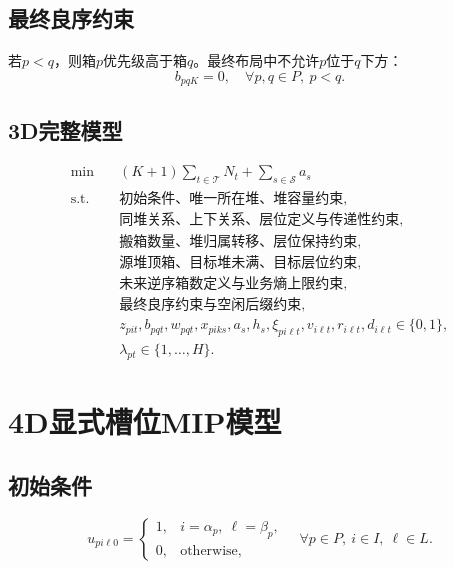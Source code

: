 \documentclass[11pt,a4paper]{ctexart}
\begin{document}
\subsection{最终良序约束}
若$p<q$，则箱$p$优先级高于箱$q$。最终布局中不允许$p$位于$q$下方：
\begin{equation}
b_{pqK}=0,\quad \forall p,q\in P,\ p<q.
\end{equation}

\subsection{3D完整模型}
\begin{equation}
\begin{aligned}
\min\quad
& (K+1)\sum_{t\in\mathcal{T}}N_t+\sum_{s\in\mathcal{S}} a_s\\
\textrm{s.t.}\quad
& \text{初始条件、唯一所在堆、堆容量约束},\\
& \text{同堆关系、上下关系、层位定义与传递性约束},\\
& \text{搬箱数量、堆归属转移、层位保持约束},\\
& \text{源堆顶箱、目标堆未满、目标层位约束},\\
& \text{未来逆序箱数定义与业务熵上限约束},\\
& \text{最终良序约束与空闲后缀约束},\\
& z_{pit},b_{pqt},w_{pqt},x_{piks},a_s,h_s,\xi_{pi\ell t},v_{i\ell t},r_{i\ell t},d_{i\ell t}\in\{0,1\},\\
& \lambda_{pt}\in\{1,\ldots,H\}.
\end{aligned}
\end{equation}

\section{4D显式槽位MIP模型}

\subsection{初始条件}
\begin{equation}
u_{pi\ell 0}=
\begin{cases}
1, & i=\alpha_p,\ \ell=\beta_p,\\
0, & \text{otherwise},
\end{cases}
\quad \forall p\in P,\ i\in I,\ \ell\in L.
\end{equation}
\end{document}
